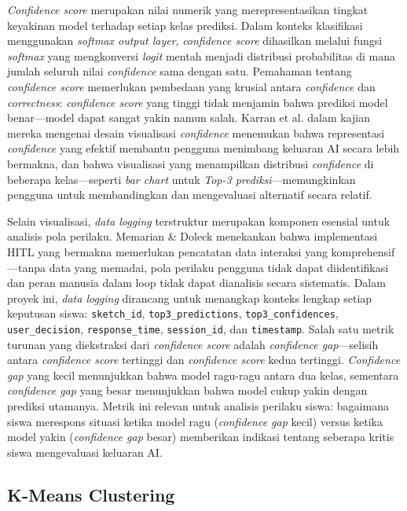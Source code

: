 \documentclass[12pt,a4paper,oneside,openany]{report}
\begin{document}
\textit{Confidence score} merupakan nilai numerik yang merepresentasikan tingkat keyakinan model terhadap setiap kelas prediksi. Dalam konteks klasifikasi menggunakan \textit{softmax output layer}, \textit{confidence score} dihasilkan melalui fungsi \textit{softmax} yang mengkonversi \textit{logit} mentah menjadi distribusi probabilitas di mana jumlah seluruh nilai \textit{confidence} sama dengan satu. Pemahaman tentang \textit{confidence score} memerlukan pembedaan yang krusial antara \textit{confidence} dan \textit{correctness}: \textit{confidence score} yang tinggi tidak menjamin bahwa prediksi model benar---model dapat sangat yakin namun salah. Karran et al. \cite{ref9} dalam kajian mereka mengenai desain visualisasi \textit{confidence} menemukan bahwa representasi \textit{confidence} yang efektif membantu pengguna menimbang keluaran AI secara lebih bermakna, dan bahwa visualisasi yang menampilkan distribusi \textit{confidence} di beberapa kelas---seperti \textit{bar chart} untuk \textit{Top-3 prediksi}---memungkinkan pengguna untuk membandingkan dan mengevaluasi alternatif secara relatif.

Selain visualisasi, \textit{data logging} terstruktur merupakan komponen esensial untuk analisis pola perilaku. Memarian \& Doleck \cite{ref5} menekankan bahwa implementasi HITL yang bermakna memerlukan pencatatan data interaksi yang komprehensif---tanpa data yang memadai, pola perilaku pengguna tidak dapat diidentifikasi dan peran manusia dalam loop tidak dapat dianalisis secara sistematis. Dalam proyek ini, \textit{data logging} dirancang untuk menangkap konteks lengkap setiap keputusan siswa: \texttt{sketch\_id}, \texttt{top3\_predictions}, \texttt{top3\_confidences}, \texttt{user\_decision}, \texttt{response\_time}, \texttt{session\_id}, dan \texttt{timestamp}. Salah satu metrik turunan yang diekstraksi dari \textit{confidence score} adalah \textit{confidence gap}---selisih antara \textit{confidence score} tertinggi dan \textit{confidence score} kedua tertinggi. \textit{Confidence gap} yang kecil menunjukkan bahwa model ragu-ragu antara dua kelas, sementara \textit{confidence gap} yang besar menunjukkan bahwa model cukup yakin dengan prediksi utamanya. Metrik ini relevan untuk analisis perilaku siswa: bagaimana siswa merespons situasi ketika model ragu (\textit{confidence gap} kecil) versus ketika model yakin (\textit{confidence gap} besar) memberikan indikasi tentang seberapa kritis siswa mengevaluasi keluaran AI.

\subsection{K-Means Clustering}
\label{subsec:kmeans}
\end{document}
